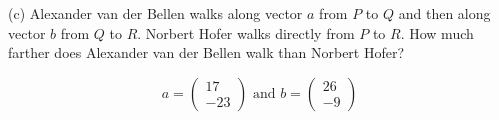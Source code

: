\documentclass[11pt]{article}
\begin{document}
(c) Alexander van der Bellen walks along vector $a$ from $P$ to $Q$
and then along vector $b$ from $Q$ to $R$. Norbert Hofer walks
directly from $P$ to $R$. How much farther does Alexander van der
Bellen walk than Norbert Hofer?

\begin{equation}
  \label{eq:uupianai}
a=\left(
  \begin{array}{c}
    17 \\
    -23
  \end{array}\right)\mbox{ and }
b=\left(
  \begin{array}{c}
    26 \\
    -9
  \end{array}\right)
\end{equation}
\end{document}
